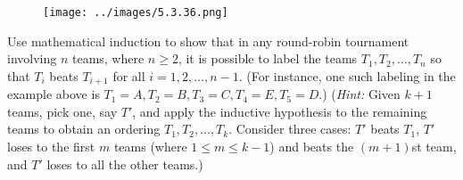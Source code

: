 \documentclass[14pt]{extarticle}
\begin{document}
\begin{figure}[ht!]
    \centering
    \texttt{[image: ../images/5.3.36.png]}
\end{figure}

Use mathematical induction to show that in any round-robin tournament involving $n$ teams, where $n \geq 2$, it is possible to label the teams $T_1, T_2, \ldots, T_n$ so that $T_i$ beats $T_{i + 1}$ for all $i = 1, 2, \ldots, n - 1$. (For instance, one such labeling in the example above is $T_1 = A, T_2 = B, T_3 = C, T_4 = E, T_5 = D$.) ({\it Hint:} Given $k+1$ teams, pick one, say $T'$, and apply the inductive hypothesis to the remaining teams to obtain an ordering $T_1, T_2, \ldots, T_k$. Consider three cases: $T'$ beats $T_1$, $T'$ loses to the first $m$ teams (where $1 \leq m \leq k - 1$) and beats the $(m + 1)$st team, and $T'$ loses to all the other teams.)
\end{document}
